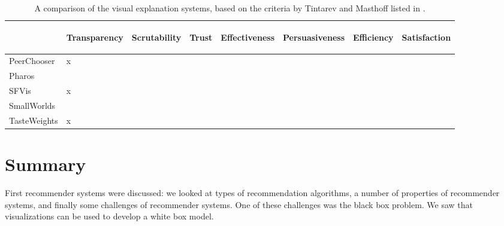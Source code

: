 \begin{center}
	\begin{table}%
	\caption{A comparison of the visual explanation systems, based on the criteria by Tintarev and Masthoff listed in \cite{tintarev:2007:SER:1547550.1547664}.}
		\begin{center}
			\begin{tabular}{l | l l l l l l l }
				\hline
											&	\begin{sideways}Transparency\end{sideways} & \begin{sideways}Scrutability\end{sideways} & \begin{sideways}Trust\end{sideways} & \begin{sideways}Effectiveness\end{sideways} & \begin{sideways}Persuasiveness\end{sideways} & \begin{sideways}Efficiency\end{sideways} & \begin{sideways}Satisfaction\end{sideways}  \\
				\hline
				PeerChooser		&	x &	&	&	& & &  \\
				Pharos				&	 &	&	&	& & &  \\
				SFVis					&	x &	&	&	& & &  \\
				SmallWorlds		&	 &	&	&	& & &  \\
				TasteWeights	&	x &	&	&	& & &  \\
				\hline
			\end{tabular}
		\end{center}
		
		\label{table:comparison:criteria}
	\end{table}
\end{center}







\section{Summary}\label{chapter:literature_study:section:summary}

First recommender systems were discussed: we looked at types of recommendation algorithms, a number of properties of recommender systems, and finally some challenges of recommender systems. One of these challenges was the black box problem. We saw that visualizations can be used to develop a white box model.

